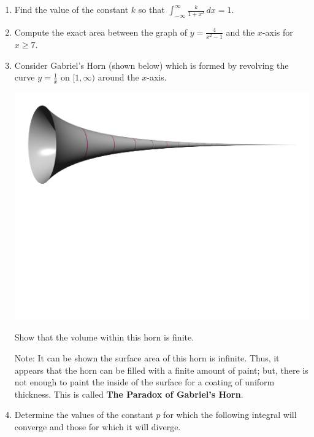 \documentclass[12pt]{article}
\newif\ifans
\begin{document}
\begin{enumerate}
\ifans{\fbox{$-\infty$}} \fi

\item Find the value of the constant $k$ so that $\int_{-\infty}^{\infty} \frac{k}{1+x^2} \,dx=1$.

\ifans{\fbox{$\frac{1}{\pi}$}} \fi

\item Compute the exact area between the graph of $y=\frac{4}{x^2-1}$ and the $x$-axis for $x \geq 7$.

\ifans{\fbox{$2\ln{\left(\frac{4}{3}\right)}$}} \fi

\item Consider Gabriel's Horn (shown below) which is formed by revolving the curve $y=\frac{1}{x}$ on $[1,\infty)$ around the $x$-axis.

\begin{center}
\includegraphics[scale=0.5]{GabrielHorn.pdf}
\end{center}

Show that the volume within this horn is finite.

\bigskip

Note: It can be shown the surface area of this horn is infinite.  Thus, it appears that the horn can be filled with a finite amount of paint; but, there is not enough to paint the inside of the surface for a coating of uniform thickness.  This is called {\bf The Paradox of Gabriel's Horn}.

\ifans{\fbox{$V=\pi$ cubic units}} \fi

\item Determine the values of the constant $p$ for which the following integral will converge and those for which it will diverge.  


\end{enumerate}
\end{document}
